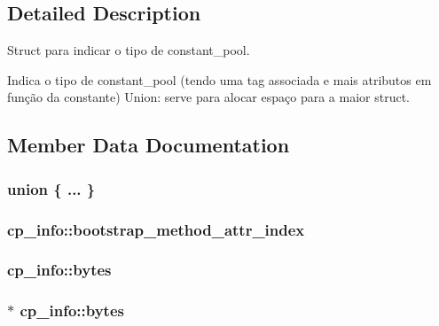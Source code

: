 \subsection{Detailed Description}
Struct para indicar o tipo de constant\+\_\+pool. 

Indica o tipo de constant\+\_\+pool (tendo uma tag associada e mais atributos em função da constante) Union\+: serve para alocar espaço para a maior struct. 

\subsection{Member Data Documentation}
\subsubsection[{\texorpdfstring{"@5}{@5}}]{\setlength{\rightskip}{0pt plus 5cm}union \{ ... \} }\hypertarget{structcp__info_a0469358e891d5c89038d59f1807d00b2}{}\label{structcp__info_a0469358e891d5c89038d59f1807d00b2}
\subsubsection[{\texorpdfstring{bootstrap\+\_\+method\+\_\+attr\+\_\+index}{bootstrap_method_attr_index}}]{ cp\+\_\+info\+::bootstrap\+\_\+method\+\_\+attr\+\_\+index}\hypertarget{structcp__info_abad11f89efc244065e72ec811f9dc929}{}\label{structcp__info_abad11f89efc244065e72ec811f9dc929}
\subsubsection[{\texorpdfstring{bytes}{bytes}}]{ cp\+\_\+info\+::bytes}\hypertarget{structcp__info_a4dcce18f4a19e8112079dc11dc2f5386}{}\label{structcp__info_a4dcce18f4a19e8112079dc11dc2f5386}
\subsubsection[{\texorpdfstring{bytes}{bytes}}]{$\ast$ cp\+\_\+info\+::bytes}\hypertarget{structcp__info_a30f97eda54e30a923a217520316e9301}{}\label{structcp__info_a30f97eda54e30a923a217520316e9301}
